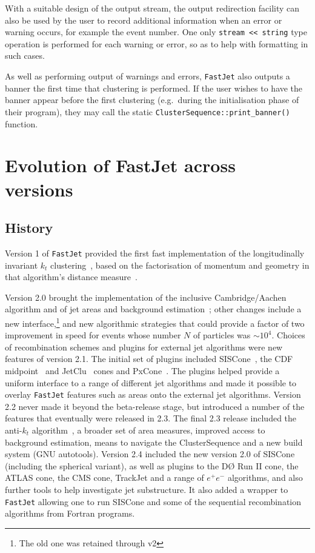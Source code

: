 \documentclass[12pt,a4]{article}
\newcommand{\fastjet}{\texttt{FastJet}\xspace}
\newcommand{\ttt}[1]{{\small\texttt{#1}}}
\newcommand{\Dzero}{D\O\xspace}
\begin{document}
With a suitable design of the output stream, the output redirection
facility can also be used by the user to record additional information
when an error or warning occurs, for example the event number.
%
One only \ttt{stream << string} type operation is performed for each
warning or error, so as to help with formatting in such cases.

As well as performing output of warnings and errors, \fastjet also
outputs a banner the first time that clustering is performed.
%
If the user wishes to have the banner appear before the first
clustering (e.g.\ during the initialisation phase of their program),
they may call the static \ttt{ClusterSequence::print\_banner()}
function.


\section{Evolution of FastJet across versions}
\label{sec:fastjet-history}

\subsection{History}
Version 1 of \fastjet provided the first fast implementation of the
longitudinally invariant $k_t$ clustering~\cite{ktexcl,ktincl}, based
on the factorisation of momentum and geometry in that algorithm's
distance measure~\cite{fastjet}.


Version 2.0 brought
%
the implementation of the inclusive Cambridge/Aachen algorithm
\cite{CamOrig,CamWobisch} and of jet areas and background
estimation~\cite{cs,CSSAreas}; other changes include a new
interface,\footnote{The old one was retained through v2} and new
algorithmic strategies that could provide a factor of two improvement
in speed for events whose number $N$ of particles was $\sim 10^4$.
%
Choices of recombination schemes and plugins for external jet
algorithms were new features of version 2.1.  
%
The initial set of plugins included SISCone~\cite{SISCone}, the CDF
midpoint~\cite{RunII-jet-physics} and JetClu~\cite{Abe:1991ui} cones
and PxCone~\cite{PxCone,Seymour:2006vv}.
%
The plugins helped provide a uniform interface to a range of different
jet algorithms and made it possible to overlay \fastjet features such as areas
onto the external jet algorithms.
%
Version 2.2 never made it beyond the beta-release stage, but
introduced a number of the features that eventually were released in 2.3.
%
The final 2.3 release included the anti-$k_t$ algorithm~\cite{antikt},
a broader set of area measures, improved access to background
estimation, means to navigate the ClusterSequence and a new build system
(GNU autotools).
%
%
Version 2.4 included the new version 2.0 of SISCone (including the
spherical variant), as well as
plugins to the \Dzero Run II cone, the ATLAS cone, the CMS cone,
TrackJet and a range of $e^+e^-$ algorithms, and also further tools to
help investigate jet substructure.
%
It also added a wrapper to \fastjet 
allowing one to run SISCone and some of the sequential recombination
algorithms from Fortran programs.
\end{document}
